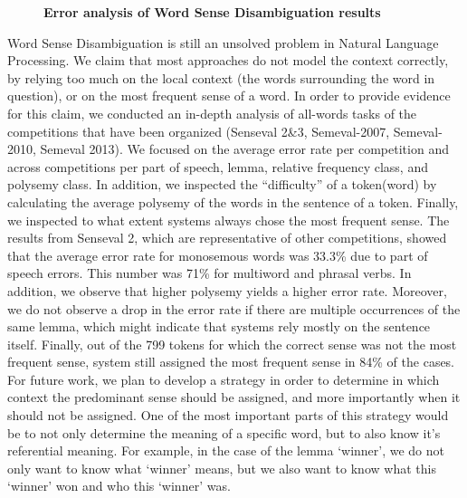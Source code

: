 \documentclass[10pt, a4paper, twopage, headinclude, footinclude, BCOR5mm]{book}
\begin{document}
\newpage

\begin{figure}[t!]
\centering
\large\textbf{Error analysis of Word Sense Disambiguation results}
\vspace*{0.5cm}
\end{figure}


\begin{table}[t!]
\end{table} 
\noindent
Word Sense Disambiguation is still an unsolved problem in Natural Language Processing. We claim that most approaches do not model the context correctly, by relying too much on the local context (the words surrounding the word in question), or on the most frequent sense of a word. 	In order to provide evidence for this claim, we conducted an in-depth analysis of all-words tasks of the competitions that have been organized (Senseval 2\&3, Semeval-2007, Semeval-2010, Semeval 2013). We focused on the average error rate per competition and across competitions per part of speech, lemma, relative frequency class, and polysemy class. In addition, we inspected the “difficulty” of a token(word) by calculating the average polysemy of the words in the sentence of a token. Finally, we inspected to what extent systems always chose the most frequent sense. 	The results from Senseval 2, which are representative of other competitions, showed that the average error rate for monosemous words was 33.3\% due to part of speech errors. This number was 71\% for multiword and phrasal verbs. In addition, we observe that higher polysemy yields a higher error rate. Moreover, we do not observe a drop in the error rate if there are multiple occurrences of the same lemma, which might indicate that systems rely mostly on the sentence itself. Finally, out of the 799 tokens for which the correct sense was not the most frequent sense, system still assigned the most frequent sense in 84\% of the cases. 	For future work, we plan to develop a strategy in order to determine in which context the predominant sense should be assigned, and more importantly when it should not be assigned. One of the most important parts of this strategy would be to not only determine the meaning of a specific word, but to also know it's referential meaning. For example, in the case of the lemma `winner', we do not only want to know what `winner' means, but we also want to know what this `winner' won and who this `winner' was.  
\end{document}
